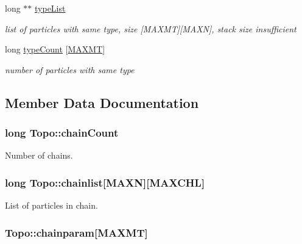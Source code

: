 \begin{DoxyCompactItemize}
long $\ast$$\ast$ \hyperlink{struct_topo_a22f7e415c3b4f361dfe7c5198d258640}{type\+List}
\begin{DoxyCompactList}\small\item\em list of particles with same type, size \mbox{[}M\+A\+X\+M\+T\mbox{]}\mbox{[}M\+A\+X\+N\mbox{]}, stack size insufficient \end{DoxyCompactList}\item 
long \hyperlink{struct_topo_ac2097d6a83653e5c5d4e48095a05fd3b}{type\+Count} \mbox{[}\hyperlink{macros_8h_ad002a98462c90c52983b122ab9e2059a}{M\+A\+X\+M\+T}\mbox{]}
\begin{DoxyCompactList}\small\item\em number of particles with same type \end{DoxyCompactList}\end{DoxyCompactItemize}


\subsection{Member Data Documentation}
\hypertarget{struct_topo_a495b774a95d31633fc20355873c715ae}{
\subsubsection[{chain\+Count}]{\setlength{\rightskip}{0pt plus 5cm}long Topo\+::chain\+Count}}\label{struct_topo_a495b774a95d31633fc20355873c715ae}


Number of chains. 

\hypertarget{struct_topo_ab4216e46c501eaca30955d5c033cf964}{
\subsubsection[{chainlist}]{\setlength{\rightskip}{0pt plus 5cm}long Topo\+::chainlist\mbox{[}{\bf M\+A\+X\+N}\mbox{]}\mbox{[}{\bf M\+A\+X\+C\+H\+L}\mbox{]}}}\label{struct_topo_ab4216e46c501eaca30955d5c033cf964}


List of particles in chain. 

\hypertarget{struct_topo_ad2fd76157e249ae9f908389b98586662}{
\subsubsection[{chainparam}]{ Topo\+::chainparam\mbox{[}{\bf M\+A\+X\+M\+T}\mbox{]}}}\label{struct_topo_ad2fd76157e249ae9f908389b98586662}


